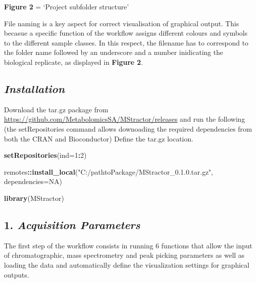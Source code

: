 \documentclass[
]{article}
\newenvironment{Shaded}{\begin{snugshade}}{\end{snugshade}}
\newcommand{\DataTypeTok}[1]{\textcolor[rgb]{0.13,0.29,0.53}{#1}}
\newcommand{\DecValTok}[1]{\textcolor[rgb]{0.00,0.00,0.81}{#1}}
\newcommand{\KeywordTok}[1]{\textcolor[rgb]{0.13,0.29,0.53}{\textbf{#1}}}
\newcommand{\NormalTok}[1]{#1}
\newcommand{\OperatorTok}[1]{\textcolor[rgb]{0.81,0.36,0.00}{\textbf{#1}}}
\newcommand{\StringTok}[1]{\textcolor[rgb]{0.31,0.60,0.02}{#1}}
\begin{document}
\textbf{Figure 2} = `Project subfolder structure'

File naming is a key aspect for correct visualisation of graphical
output. This becasue a specific function of the workflow assigns
different colours and symbols to the different sample classes. In this
respect, the filename has to correspond to the folder name followed by
an underscore and a number inidicating the biological replicate, as
displayed in \textbf{Figure 2}.

\hypertarget{installation}{%
\subsection{\texorpdfstring{\emph{Installation
}}{Installation }}\label{installation}}

Download the tar.gz package from
\url{https://github.com/MetabolomicsSA/MStractor/releases} and run the
following (the setRepositories command allows downoading the required
dependencies from both the CRAN and Bioconductor) Define the tar.gz
location.

\begin{Shaded}
\begin{Highlighting}[]
\KeywordTok{setRepositories}\NormalTok{(}\DataTypeTok{ind=}\DecValTok{1}\OperatorTok{:}\DecValTok{2}\NormalTok{)}

\NormalTok{remotes}\OperatorTok{::}\KeywordTok{install\_local}\NormalTok{(}\StringTok{"C:/pathtoPackage/MStractor\_0.1.0.tar.gz"}\NormalTok{, }
 \StringTok{\textquotesingle{}               dependencies=NA)}
\end{Highlighting}
\end{Shaded}

\begin{Shaded}
\begin{Highlighting}[]
\KeywordTok{library}\NormalTok{(MStractor)}
\end{Highlighting}
\end{Shaded}

\hypertarget{acquisition-parameters}{%
\subsection{\texorpdfstring{1. \emph{Acquisition
Parameters}}{1. Acquisition Parameters}}\label{acquisition-parameters}}

The first step of the workflow consists in running 6 functions that
allow the input of chromatographic, mass spectrometry and peak picking
parameters as well as loading the data and automatically define the
visualization settings for graphical outputs.
\end{document}
